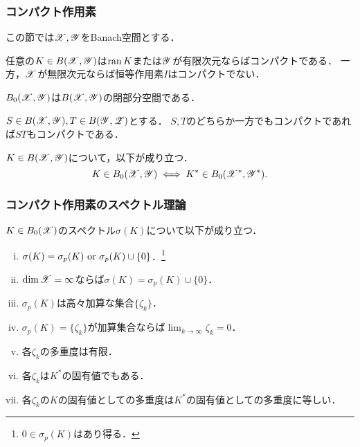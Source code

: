     \subsubsection{コンパクト作用素}
    この節では$\mathscr{X}, \mathscr{Y}$をBanach空間とする．
    \begin{Prop}[p.257,p.261] \label{prop-cmp}
        任意の$K \in B(\mathscr{X},\mathscr{Y})$は$\operatorname{ran} K$または$\mathscr{Y}$が有限次元ならばコンパクトである．
        一方，$\mathscr{X}$が無限次元ならば恒等作用素$I$はコンパクトでない．
    \end{Prop}
    \begin{Them}[定理11.12, p.257] \label{them1112}
        $B_0(\mathscr{X},\mathscr{Y})$は$B(\mathscr{X},\mathscr{Y})$の閉部分空間である．
    \end{Them}
    \begin{Them}[定理11.13, p.258] \label{them1113}
        $S \in B(\mathscr{X}, \mathscr{Y}), T \in B(\mathscr{Y},\mathscr{Z})$とする．
        $S,T$のどちらか一方でもコンパクトであれば$ST$もコンパクトである．
    \end{Them}
    \begin{Them}[Schauderの定理, 定理11.15, p.258] \label{them1115}
        $K \in B(\mathscr{X},\mathscr{Y})$について，以下が成り立つ．
        \[ K \in B_0(\mathscr{X},\mathscr{Y}) \iff K^* \in B_0(\mathscr{X}^*,\mathscr{Y}^*). \]
    \end{Them}

    \subsubsection{コンパクト作用素のスペクトル理論}
    \begin{Them}[定理11.29, p.269] \label{them1129}
        $K \in B_0(\mathscr{X})$のスペクトル$\sigma(K)$について以下が成り立つ．
        \begin{enumerate}[i)]
            \item $\sigma(K)=\sigma_p(K) \text{ or } \sigma_p(K) \cup \{0\}$．\footnote{$0 \in \sigma_p(K)$はあり得る．}
            \item $\dim \mathscr{X}=\infty$ならば$\sigma(K)=\sigma_p(K) \cup \{0\}$．
            \item $\sigma_p(K)$は高々加算な集合$\{\zeta_k\}$．
            \item $\sigma_p(K)=\{\zeta_k\}$が加算集合ならば$\lim_{k \to \infty}\zeta_k=0$．
            \item 各$\zeta_k$の多重度は有限．
            \item 各$\zeta_k$は$K^*$の固有値でもある．
            \item 各$\zeta_k$の$K$の固有値としての多重度は$K^*$の固有値としての多重度に等しい．
        \end{enumerate}
    \end{Them}

